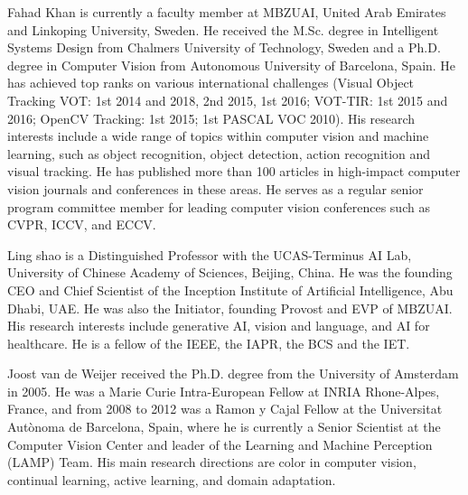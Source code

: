 \documentclass[10pt,journal,compsoc]{IEEEtran}
\begin{document}
\begin{IEEEbiography}{Fahad Khan}
is currently a faculty member at MBZUAI, United Arab Emirates and Linkoping University, Sweden. 
He received the M.Sc. degree in Intelligent Systems Design from Chalmers University of Technology, Sweden and a Ph.D. degree in Computer Vision from Autonomous University of
Barcelona, Spain. He has achieved top ranks on various international challenges (Visual Object Tracking VOT: 1st 2014 and 2018, 2nd 2015, 1st 2016; VOT-TIR: 1st 2015 and 2016; OpenCV Tracking: 1st 2015; 1st PASCAL VOC 2010). His research interests include a wide range of topics within computer vision and machine learning, such as object recognition, object detection, action recognition and visual tracking. He has published more than 100 articles in high-impact computer vision journals and conferences in these areas. He serves as a regular senior program committee member for leading computer vision conferences such as CVPR, ICCV, and ECCV.
\end{IEEEbiography}


\vspace{-1.0cm}

\begin{IEEEbiography}{Ling shao} 
is a Distinguished Professor with the UCAS-Terminus AI Lab, University of Chinese Academy of Sciences, Beijing, China. He was the founding CEO and Chief Scientist of the Inception Institute of Artificial Intelligence, Abu Dhabi, UAE. He was also the Initiator, founding Provost and EVP of MBZUAI. His research interests include generative AI, vision and language, and AI for healthcare. He is a fellow of the IEEE, the IAPR, the BCS and the IET.
\end{IEEEbiography}


\vspace{-1.0cm}

\begin{IEEEbiography}{Joost van de Weijer} 
received the Ph.D. degree from the University of Amsterdam in 2005. He was a Marie Curie Intra-European Fellow at INRIA Rhone-Alpes, France, and from 2008 to 2012 was a Ramon y Cajal Fellow at the Universitat Autònoma de Barcelona, Spain, where he is currently a Senior Scientist at the Computer Vision Center and leader of the Learning and Machine Perception (LAMP) Team. His main research directions are color in computer vision, continual learning, active learning, and domain adaptation.
\end{IEEEbiography}
\end{document}
